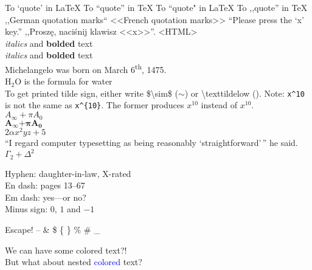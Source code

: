 To `quote' in \LaTeX \newline
To ``quote'' in \TeX \newline
To ``quote" in \LaTeX \newline
To ,,quote'' in \TeX \newline
,,German quotation marks`` \newline
<<French quotation marks>> \newline
``Please press the `x' key.'' \newline
,,Proszę, naciśnij klawisz <<x>>''. \newline
\textless{}HTML\textgreater\\
{\it italics} and {\bf bolded} text\\
\textit{italics} and \textbf{bolded} text\\
Michelangelo was born on March 6\textsuperscript{th}, 1475.\\
H$_2$O is the formula for water\\
To get printed tilde sign, either write \$\backslash{}sim\$ ($\sim$) or \backslash{texttildelow} (\texttildelow).\newline
Note: \verb,x^10, is not the same as \verb,x^{10},. The former produces $x^10$ instead of $x^{10}$.\\
$A_\infty + \pi A_0$\\
$\mathbf{A}_\mathbf{\infty} \mathbf{+} \mathbf{\pi} \mathbf{A}_\mathbf{0}$\\
$2\alpha x^2yz+5$\\
``I regard computer typesetting as being reasonably `straightforward'\,'' he said.\\
$\Gamma_{\!2}+\Delta^{\!2}$

Hyphen: daughter-in-law, X-rated\\
En dash: pages 13--67\\
Em dash: yes---or no? \\
Minus sign: $0$, $1$ and $-1$

Escape! -- \; \& \; \$ \; \{ \; \} \; \% \; \#\; \_

We can have {\color{red}some colored text}?!\\
But what about {\color{red}nested \textcolor{blue}{colored} text}?
